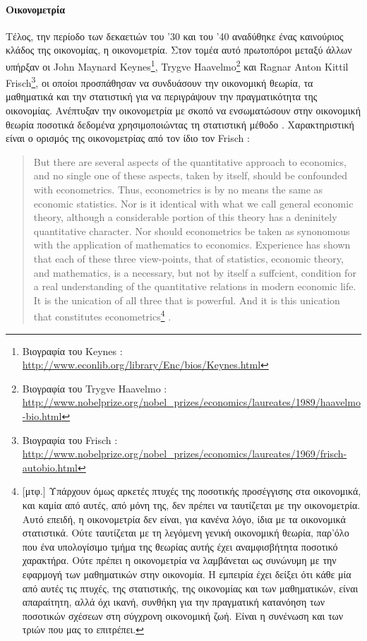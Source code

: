 \documentclass[a4paper,12pt,twoside]{report}
\begin{document}
{			\paragraph{Οικονομετρία}{Τέλος, την περίοδο των δεκαετιών του '30 και του '40 αναδύθηκε ένας καινούριος κλάδος της οικονομίας, η οικονομετρία. Στον τομέα αυτό πρωτοπόροι μεταξύ άλλων υπήρξαν οι John Maynard Keynes\footnote{Βιογραφία του Keynes : \url{http://www.econlib.org/library/Enc/bios/Keynes.html}}, Trygve Haavelmo\footnote{Βιογραφία του Trygve Haavelmo : \url{http://www.nobelprize.org/nobel_prizes/economics/laureates/1989/haavelmo-bio.html}} και Ragnar Anton Kittil Frisch\footnote{Βιογραφία του Frisch : \url{http://www.nobelprize.org/nobel_prizes/economics/laureates/1969/frisch-autobio.html}}, οι οποίοι προσπάθησαν να συνδυάσουν την οικονομική θεωρία, τα μαθηματικά και την στατιστική για να περιγράψουν την πραγματικότητα της οικονομίας. Ανέπτυξαν την οικονομετρία με σκοπό να ενσωματώσουν στην οικονομική θεωρία ποσοτικά δεδομένα χρησιμοποιώντας τη στατιστική μέθοδο \cite[κεφ. Πρόλογος]{TheProbabilityApproachInEconometrics:Trygne1944}. Χαρακτηριστική είναι ο ορισμός της οικονομετρίας από τον ίδιο τον Frisch :
			\begin{quote}
				But there are several aspects of the quantitative approach to economics, and no single one of these aspects, taken by itself, should be confounded with econometrics. Thus, econometrics is by no means the same as economic statistics. Nor is it identical with what we call general economic theory, although a considerable portion of this theory has a deninitely quantitative character. Nor should econometrics be taken as synonomous with the application of mathematics to economics. Experience has shown that each of these three view-points, that of statistics, economic theory, and mathematics, is a necessary, but not by itself a suffcient, condition for a real understanding of the
quantitative relations in modern economic life. It is the unication of all three that is powerful. And it is this unication that constitutes econometrics\footnote{[μτφ.] Υπάρχουν όμως αρκετές πτυχές της ποσοτικής προσέγγισης στα οικονομικά, και καμία από αυτές, από μόνη της, δεν πρέπει να ταυτίζεται με την οικονομετρία. Αυτό επειδή, η οικονομετρία δεν είναι, για κανένα λόγο, ίδια με τα οικονομικά στατιστικά. Ούτε ταυτίζεται με τη λεγόμενη γενική οικονομική θεωρία, παρ'όλο που ένα υπολογίσιμο τμήμα της θεωρίας αυτής έχει αναμφισβήτητα ποσοτικό χαρακτήρα. Ούτε πρέπει η οικονομετρία να λαμβάνεται ως συνώνυμη με την εφαρμογή των μαθηματικών στην οικονομία. Η εμπειρία έχει δείξει ότι κάθε μία από αυτές τις πτυχές, της στατιστικής, της οικονομίας και των μαθηματικών, είναι απαραίτητη, αλλά όχι ικανή, συνθήκη για την πραγματική κατανόηση των ποσοτικών σχέσεων στη σύγχρονη οικονομική ζωή. Είναι η συνένωση και των τριών που μας το επιτρέπει.} \cite[κεφ. Editorial]{EconometricaEditorial:Frisch1933}.
			\end{quote}
			}
}
\end{document}
